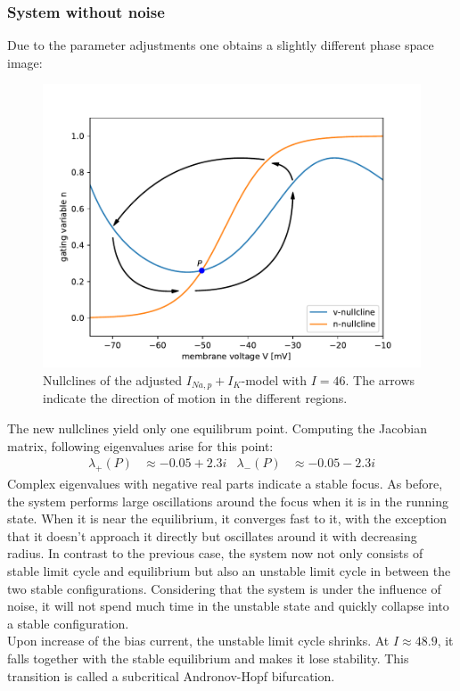 \documentclass[12pt,a4paper]{article}
\begin{document}
\subsubsection{System without noise}\label{anhopfwon}
Due to the parameter adjustments one obtains a slightly different phase space image:
\begin{figure}[H]
	\centering
	\includegraphics[scale=0.95]{inapikanhopfnc.pdf}\caption{Nullclines of the adjusted $I_{Na,p}+I_K$-model with $I=46$. The arrows indicate the direction of motion in the different regions.}
	\label{anhopfnc}
\end{figure}
The new nullclines yield only one equilibrum point. Computing the Jacobian matrix, following eigenvalues arise for this point:
\begin{align*}
\lambda_+(P)&\approx -0.05 + 2.3i& \lambda_-(P)&\approx -0.05 - 2.3i
\end{align*}
Complex eigenvalues with negative real parts indicate a stable focus. As before, the system performs large oscillations around the focus when it is in the running state. When it is near the equilibrium, it converges fast to it, with the exception that it doesn't approach it directly but oscillates around it with decreasing radius.
In contrast to the previous case, the system now not only consists of stable limit cycle and equilibrium but also an unstable limit cycle in between the two stable configurations. Considering that the system is under the influence of noise, it will not spend much time in the unstable state and quickly collapse into a stable configuration.\\
Upon increase of the bias current, the unstable limit cycle shrinks. At $I\approx 48.9$, it falls together with the stable equilibrium and makes it lose stability. This transition is called a subcritical Andronov-Hopf bifurcation.\\
\end{document}
